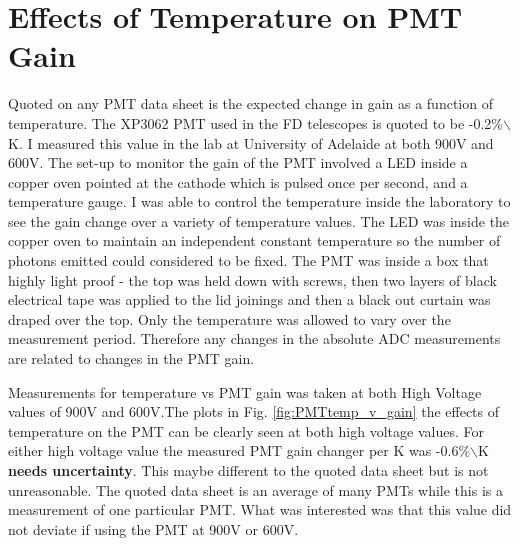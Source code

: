 \section{Effects of Temperature on PMT Gain}

Quoted on any PMT data sheet is the expected change in gain as a function of temperature. The XP3062 PMT used in the FD telescopes is quoted to be -0.2\%$\backslash$K. I measured this value in the lab at University of Adelaide at both 900V and 600V. The set-up to monitor the gain of the PMT involved a LED inside a copper oven pointed at the cathode which is pulsed once per second, and a temperature gauge. I was able to control the temperature inside the laboratory to see the gain change over a variety of temperature values. The LED was inside the copper oven to maintain an independent constant temperature so the number of photons emitted could considered to be fixed. The PMT was inside a box that highly light proof - the top was held down with screws, then two layers of black electrical tape was applied to the lid joinings and then a black out curtain was draped over the top. Only the temperature was allowed to vary over the measurement period. Therefore any changes in the absolute ADC measurements are related to changes in the PMT gain.

Measurements for temperature vs PMT gain was taken at both High Voltage values of 900V and 600V.The plots in Fig. \ref{fig:PMTtemp_v_gain} the effects of temperature on the PMT can be clearly seen at both high voltage values. For either high voltage value the measured PMT gain changer per K was -0.6\%$\backslash$K \textbf{needs uncertainty}. This maybe different to the quoted data sheet but is not unreasonable. The quoted data sheet is an average of many PMTs while this is a measurement of one particular PMT. What was interested was that this value did not deviate if using the PMT at 900V or 600V.


